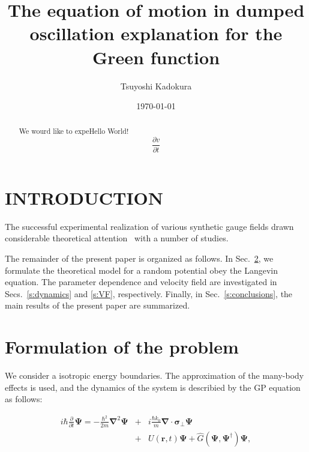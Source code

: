 \documentclass[aps,onecolumn,superscriptaddress,showpacs,pra]{revtex4}
\begin{document}
    \title{The equation of motion in dumped oscillation explanation for the Green function}

    \author{Tsuyoshi Kadokura}

    \date{\today}
    \begin{abstract}

        We wourd like to expeHello World! \ 
	    \begin{displaymath}
            \frac{\partial v}{\partial t}
        \end{displaymath}
    \end{abstract}


    \maketitle

    \section{INTRODUCTION}
    \label{s:introduction}

    The successful experimental realization of various synthetic gauge fields
    drawn considerable theoretical attention~\cite{A. Messiah}
    with a number of studies.


    The remainder of the present paper is organized as follows. In
    Sec.~\ref{s:formulation}, we formulate the theoretical model
    for a random potential obey the Langevin equation.
    The parameter dependence and velocity field are investigated in
    Secs.~\ref{s:dynamics} and \ref{s:VF}, respectively.
    Finally, in Sec.~\ref{s:conclusions}, the main results of the present
    paper are summarized.

    \section{Formulation of the problem}
    \label{s:formulation}

    We consider a isotropic energy boundaries.
    The approximation of the many-body effects is used, and the dynamics of the system is
    describied by the GP equation as follows:

    \begin{eqnarray}
        \label{eq:GP}
        i \hbar \frac{\partial}{\partial t}\bm \Psi =
        - \frac{\hbar^2}{2m}\bm{\nabla}^2\bm{\Psi}
        &+&i\frac{\hbar k_0}{m} \bm{\nabla} \cdot \bm{\sigma}_\perp \bm\Psi
        \nonumber\\
        &+&U(\bm r,t)\bm\Psi
        + \hat{G}\left( \bm\Psi,\bm \Psi^\dagger\right)\bm\Psi,
    \end{eqnarray}
\end{document}
